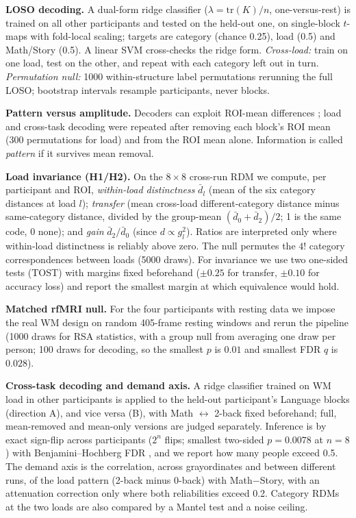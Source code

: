 \documentclass[conference]{IEEEtran}
\begin{document}
\textbf{LOSO decoding.} A dual-form ridge classifier ($\lambda=\mathrm{tr}(K)/n$, one-versus-rest) is trained on all other participants and tested on the held-out one, on single-block $t$-maps with fold-local scaling; targets are category (chance 0.25), load (0.5) and Math/Story (0.5). A linear SVM cross-checks the ridge form. \emph{Cross-load:} train on one load, test on the other, and repeat with each category left out in turn. \emph{Permutation null:} 1000 within-structure label permutations rerunning the full LOSO; bootstrap intervals resample participants, never blocks.

\textbf{Pattern versus amplitude.} Decoders can exploit ROI-mean differences \cite{coutanche2013}; load and cross-task decoding were repeated after removing each block's ROI mean (300 permutations for load) and from the ROI mean alone. Information is called \emph{pattern} if it survives mean removal.

\textbf{Load invariance (H1/H2).} On the $8\times8$ cross-run RDM we compute, per participant and ROI, \emph{within-load distinctness} $\bar d_l$ (mean of the six category distances at load $l$); \emph{transfer} (mean cross-load different-category distance minus same-category distance, divided by the group-mean $(\bar d_0+\bar d_2)/2$; 1 is the same code, 0 none); and \emph{gain} $\bar d_2/\bar d_0$ (since $d\propto g_l^2$). Ratios are interpreted only where within-load distinctness is reliably above zero. The null permutes the $4!$ category correspondences between loads (5000 draws). For invariance we use two one-sided tests (TOST) \cite{schuirmann1987} with margins fixed beforehand ($\pm0.25$ for transfer, $\pm0.10$ for accuracy loss) and report the smallest margin at which equivalence would hold.

\textbf{Matched rfMRI null.} For the four participants with resting data we impose the real WM design on random 405-frame resting windows and rerun the pipeline (1000 draws for RSA statistics, with a group null from averaging one draw per person; 100 draws for decoding, so the smallest $p$ is $0.01$ and smallest FDR $q$ is $0.028$).

\textbf{Cross-task decoding and demand axis.} A ridge classifier trained on WM load in other participants is applied to the held-out participant's Language blocks (direction A), and vice versa (B), with Math $\leftrightarrow$ 2-back fixed beforehand; full, mean-removed and mean-only versions are judged separately. Inference is by exact sign-flip across participants ($2^n$ flips; smallest two-sided $p=0.0078$ at $n=8$) with Benjamini--Hochberg FDR \cite{benjamini1995}, and we report how many people exceed 0.5. The demand axis is the correlation, across grayordinates and between different runs, of the load pattern (2-back minus 0-back) with Math$-$Story, with an attenuation correction only where both reliabilities exceed 0.2. Category RDMs at the two loads are also compared by a Mantel test \cite{mantel1967} and a noise ceiling.
\end{document}
